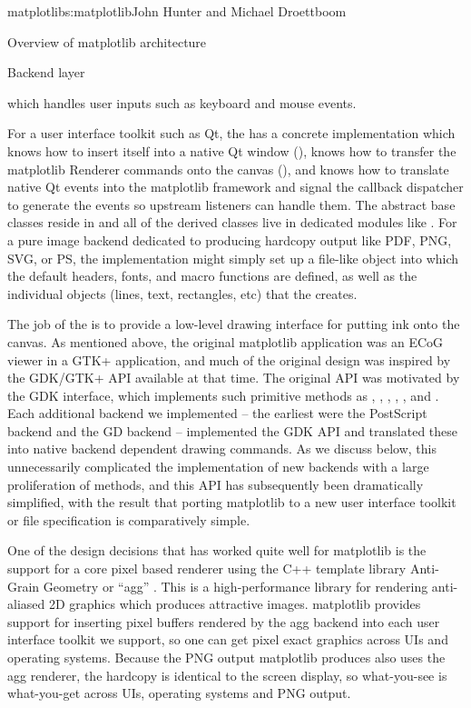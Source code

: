 \begin{aosachapter}{matplotlib}{s:matplotlib}{John Hunter and Michael Droettboom}
\begin{aosasect1}{Overview of matplotlib architecture}
\begin{aosasect2}{Backend layer}
\begin{aosaitemize}
\item {} which handles user inputs such as keyboard and
  mouse events.
\end{aosaitemize}

For a user interface toolkit such as Qt, the  has a
concrete implementation which knows how to insert itself into a native
Qt window (), knows how to transfer the
matplotlib Renderer commands onto the canvas (),
and knows how to translate native Qt events into the matplotlib
 framework and signal the callback dispatcher to generate
the events so upstream listeners can handle them.  The abstract base
classes reside in  and all of the
derived classes live in dedicated modules like
.  For a pure image backend
dedicated to producing hardcopy output like PDF, PNG, SVG, or PS, the
 implementation might simply set up a file-like
object into which the default headers, fonts, and macro functions are
defined, as well as the individual objects (lines, text, rectangles,
etc) that the  creates.

The job of the  is to provide a low-level drawing
interface for putting ink onto the canvas.  As mentioned above, the
original matplotlib application was an ECoG viewer in a GTK+
application, and much of the original design was inspired by the
GDK/GTK+ API available at that time.  The original  API
was motivated by the GDK  interface, which implements
such primitive methods as , ,
, , , and
.  Each additional backend we implemented -- the
earliest were the PostScript backend and the GD backend -- implemented
the GDK  API and translated these into native backend
dependent drawing commands.  As we discuss below, this unnecessarily
complicated the implementation of new backends with a large
proliferation of methods, and this API has subsequently been
dramatically simplified, with the result that porting matplotlib to a
new user interface toolkit or file specification is comparatively
simple.

One of the design decisions that has worked quite well for matplotlib
is the support for a core pixel based renderer using the C++ template
library Anti-Grain Geometry or ``agg'' \cite{bib:agg}.  This is a
high-performance library for rendering anti-aliased 2D graphics which
produces attractive images.  matplotlib provides support for inserting
pixel buffers rendered by the agg backend into each user interface
toolkit we support, so one can get pixel exact graphics across UIs and
operating systems.  Because the PNG output matplotlib produces also
uses the agg renderer, the hardcopy is identical to the screen
display, so what-you-see is what-you-get across UIs, operating systems
and PNG output.


\end{aosasect2}
\end{aosasect1}
\end{aosachapter}
